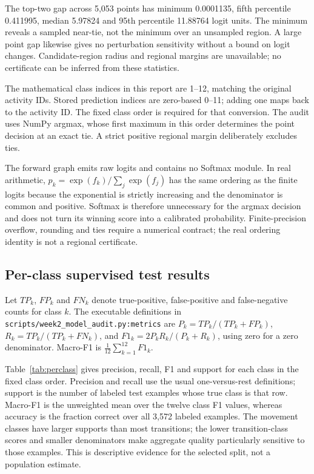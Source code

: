 \documentclass[11pt,a4paper]{article}
\newcommand{\code}[1]{{\small\ttfamily\nolinkurl{#1}}}
\begin{document}
The top-two gap across 5,053 points has minimum 0.0001135, fifth percentile 0.411995, median 5.97824 and 95th percentile 11.88764 logit units. The minimum reveals a sampled near-tie, not the minimum over an unsampled region. A large point gap likewise gives no perturbation sensitivity without a bound on logit changes. Candidate-region radius and regional margins are unavailable; no certificate can be inferred from these statistics.

The mathematical class indices in this report are 1--12, matching the original activity IDs. Stored prediction indices are zero-based 0--11; adding one maps back to the activity ID. The fixed class order is required for that conversion. The audit uses NumPy argmax, whose first maximum in this order determines the point decision at an exact tie. A strict positive regional margin deliberately excludes ties.

The forward graph emits raw logits and contains no Softmax module. In real arithmetic, $p_k=\exp(f_k)/\sum_j\exp(f_j)$ has the same ordering as the finite logits because the exponential is strictly increasing and the denominator is common and positive. Softmax is therefore unnecessary for the argmax decision and does not turn its winning score into a calibrated probability. Finite-precision overflow, rounding and ties require a numerical contract; the real ordering identity is not a regional certificate.

\subsection{Per-class supervised test results}
Let $TP_k$, $FP_k$ and $FN_k$ denote true-positive, false-positive and false-negative counts for class $k$. The executable definitions in \code{scripts/week2_model_audit.py:metrics} are $P_k=TP_k/(TP_k+FP_k)$, $R_k=TP_k/(TP_k+FN_k)$, and $F1_k=2P_kR_k/(P_k+R_k)$, using zero for a zero denominator. Macro-F1 is $\frac1{12}\sum_{k=1}^{12}F1_k$.

Table~\ref{tab:perclass} gives precision, recall, F1 and support for each class in the fixed class order. Precision and recall use the usual one-versus-rest definitions; support is the number of labeled test examples whose true class is that row. Macro-F1 is the unweighted mean over the twelve class F1 values, whereas accuracy is the fraction correct over all 3,572 labeled examples. The movement classes have larger supports than most transitions; the lower transition-class scores and smaller denominators make aggregate quality particularly sensitive to those examples. This is descriptive evidence for the selected split, not a population estimate.
\end{document}
